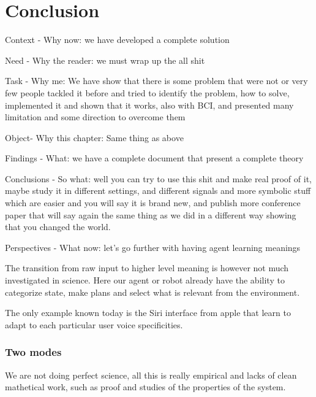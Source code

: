 
\chapter{Conclusion}
\label{chapter:conclusion}
\minitoc


Context - Why now: we have developed a complete solution

Need - Why the reader: we must wrap up the all shit 

Task - Why me: We have show that there is some problem that were not or very few people tackled it before and tried to identify the problem, how to solve, implemented it and shown that it works, also with BCI, and presented many limitation and some direction to overcome them

Object- Why this chapter: Same thing as above

Findings - What: we have a complete document that present a complete theory

Conclusions - So what: well you can try to use this shit and make real proof of it, maybe study it in different settings, and different signals and more symbolic stuff which are easier and you will say it is brand new, and publish more conference paper that will say again the same thing as we did in a different way showing that you changed the world.

Perspectives - What now: let's go further with having agent learning meanings

The transition from raw input to higher level meaning is however not much investigated in science. Here our agent or robot already have the ability to categorize state, make plans and select what is relevant from the environment.

The only example known today is the Siri interface from apple that learn to adapt to each particular user voice specificities.



\subsection{Two modes}

We are not doing perfect science, all this is really empirical and lacks of clean mathetical work, such as proof and studies of the properties of the system. 

